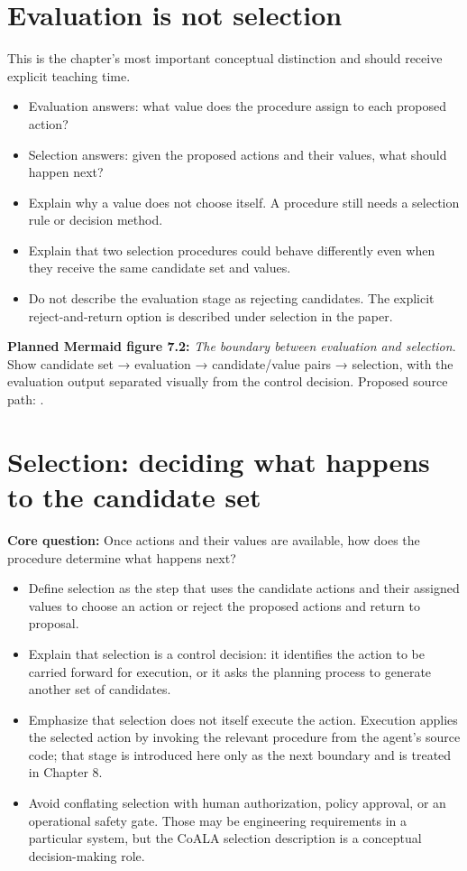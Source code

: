 \section{Evaluation is not selection}
This is the chapter's most important conceptual distinction and should receive explicit teaching time.
\begin{itemize}
  \item Evaluation answers: what value does the procedure assign to each proposed action?
  \item Selection answers: given the proposed actions and their values, what should happen next?
  \item Explain why a value does not choose itself. A procedure still needs a selection rule or decision method.
  \item Explain that two selection procedures could behave differently even when they receive the same candidate set and values.
  \item Do not describe the evaluation stage as rejecting candidates. The explicit reject-and-return option is described under selection in the paper.
\end{itemize}
\textbf{Planned Mermaid figure 7.2:} \emph{The boundary between evaluation and selection}. Show candidate set → evaluation → candidate/value pairs → selection, with the evaluation output separated visually from the control decision. Proposed source path: .

\section{Selection: deciding what happens to the candidate set}
\textbf{Core question:} Once actions and their values are available, how does the procedure determine what happens next?
\begin{itemize}
  \item Define selection as the step that uses the candidate actions and their assigned values to choose an action or reject the proposed actions and return to proposal.
  \item Explain that selection is a control decision: it identifies the action to be carried forward for execution, or it asks the planning process to generate another set of candidates.
  \item Emphasize that selection does not itself execute the action. Execution applies the selected action by invoking the relevant procedure from the agent's source code; that stage is introduced here only as the next boundary and is treated in Chapter 8.
  \item Avoid conflating selection with human authorization, policy approval, or an operational safety gate. Those may be engineering requirements in a particular system, but the CoALA selection description is a conceptual decision-making role.
\end{itemize}

